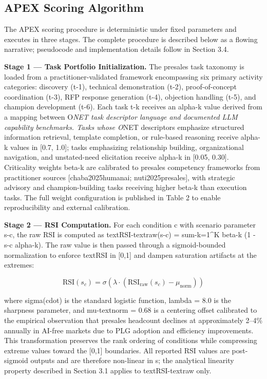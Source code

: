 \documentclass[10pt, conference]{IEEEtran}
\begin{document}
\subsection{APEX Scoring Algorithm}

\label{sec:apex_scoring_algorithm}

The APEX scoring procedure is deterministic under fixed parameters and executes in three stages. The complete procedure is described below as a flowing narrative; pseudocode and implementation details follow in Section 3.4.

\textbf{Stage 1 --- Task Portfolio Initialization.} The presales task taxonomy is loaded from a practitioner-validated framework encompassing six primary activity categories: discovery (t-1), technical demonstration (t-2), proof-of-concept coordination (t-3), RFP response generation (t-4), objection handling (t-5), and champion development (t-6). Each task t-k receives an alpha-k value derived from a mapping between O\textit{NET task descriptor language and documented LLM capability benchmarks. Tasks whose O}NET descriptors emphasize structured information retrieval, template completion, or rule-based reasoning receive alpha-k values in [0.7, 1.0]; tasks emphasizing relationship building, organizational navigation, and unstated-need elicitation receive alpha-k in [0.05, 0.30]. Criticality weights beta-k are calibrated to presales competency frameworks from practitioner sources [chaba2025humanai; nuti2025presales], with strategic advisory and champion-building tasks receiving higher beta-k than execution tasks. The full weight configuration is published in Table 2 to enable reproducibility and external calibration.

\textbf{Stage 2 --- RSI Computation.} For each condition c with scenario parameter s-c, the raw RSI is computed as textRSI-textraw(s-c) = sum-k=1^K beta-k (1 - s-c alpha-k). The raw value is then passed through a sigmoid-bounded normalization to enforce textRSI in [0,1] and dampen saturation artifacts at the extremes:

\begin{equation}
\text{RSI}(s_c) = \sigma\!\left(\lambda \cdot \left(\text{RSI}_{\text{raw}}(s_c) - \mu_{\text{norm}}\right)\right)
\end{equation}

where sigma(cdot) is the standard logistic function, lambda = 8.0 is the sharpness parameter, and mu-textnorm = 0.68 is a centering offset calibrated to the empirical observation that presales headcount declines at approximately 2--4\% annually in AI-free markets due to PLG adoption and efficiency improvements. This transformation preserves the rank ordering of conditions while compressing extreme values toward the [0,1] boundaries. All reported RSI values are post-sigmoid outputs and are therefore non-linear in s; the analytical linearity property described in Section 3.1 applies to textRSI-textraw only.
\end{document}
